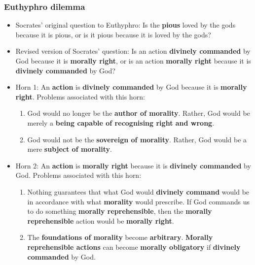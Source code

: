 \documentclass[11pt]{article}
\begin{document}
\subsubsection{Euthyphro dilemma}
\label{sec:org854e616}
\begin{itemize}
\item Socrates' original question to Euthyphro:
Is the \textbf{pious} loved by the gods because it is pious, or is it pious because it is loved by the gods?
\item Revised version of Socrates' question:
Is an action \textbf{divinely commanded} by God because it is \textbf{morally right}, or is an action \textbf{morally right} because it is \textbf{divinely commanded} by God?
\item Horn 1: An \textbf{action} is \textbf{divinely commanded} by God because it is \textbf{morally right}.
Problems associated with this horn:
\begin{enumerate}
\item God would no longer be the \textbf{author of morality}. Rather, God would be merely a \textbf{being capable of recognising right and wrong}.
\item God would not be the \textbf{sovereign of morality}. Rather, God would be a mere \textbf{subject of morality}.
\end{enumerate}
\item Horn 2: An \textbf{action} is \textbf{morally right} because it is \textbf{divinely commanded} by God.
Problems associated with this horn:
\begin{enumerate}
\item Nothing guarantees that what God would \textbf{divinely command} would be in accordance with what \textbf{morality} would prescribe. If God commands us to do something \textbf{morally reprehensible}, then the \textbf{morally reprehensible} action would be \textbf{morally right}.
\item The \textbf{foundations of morality} become \textbf{arbitrary}. \textbf{Morally reprehensible actions} can become \textbf{morally obligatory} if \textbf{divinely commanded} by God.
\end{enumerate}
\end{itemize}

 \newpage
\end{document}
